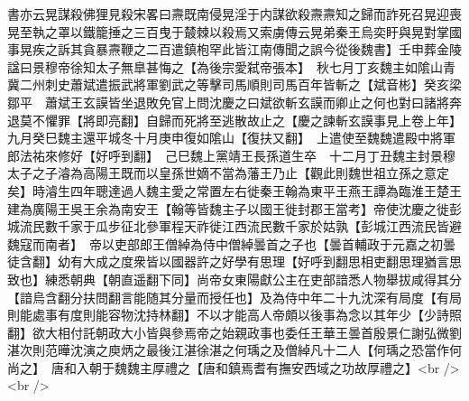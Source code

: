書亦云晃謀殺佛狸見殺宋畧曰燾既南侵晃淫于内謀欲殺燾燾知之歸而詐死召晃迎喪晃至執之罩以鐵籠捶之三百曳于樷棘以殺焉又索虜傳云晃弟秦王烏奕盱與晃對掌國事晃疾之訴其貪暴燾鞭之二百遣鎮枹罕此皆江南傳聞之誤今從後魏書】壬申葬金陵諡曰景穆帝徐知太子無臯甚悔之【為後宗愛弑帝張本】　秋七月丁亥魏主如隂山青冀二州刺史蕭斌遣振武將軍劉武之等擊司馬順則司馬百年皆斬之【斌音彬】癸亥梁鄒平　蕭斌王玄謨皆坐退敗免官上問沈慶之曰斌欲斬玄謨而卿止之何也對曰諸將奔退莫不懼罪【將即亮翻】自歸而死將至逃散故止之【慶之諫斬玄謨事見上卷上年】　九月癸巳魏主還平城冬十月庚申復如隂山【復扶又翻】　上遣使至魏魏遣殿中將軍郎法祐來修好【好呼到翻】　己巳魏上黨靖王長孫道生卒　十二月丁丑魏主封景穆太子之子濬為高陽王既而以皇孫世嫡不當為藩王乃止【觀此則魏世祖立孫之意定矣】時濬生四年聰達過人魏主愛之常置左右徙秦王翰為東平王燕王譚為臨淮王楚王建為廣陽王吳王余為南安王【翰等皆魏主子以國王徙封郡王當考】帝使沈慶之徙彭城流民數千家于瓜步征北參軍程天祚徙江西流民數千家於姑孰【彭城江西流民皆避魏寇而南者】　帝以吏部郎王僧綽為侍中僧綽曇首之子也【曇首輔政于元嘉之初曇徒含翻】幼有大成之度衆皆以國器許之好學有思理【好呼到翻思相吏翻思理猶言思致也】練悉朝典【朝直遥翻下同】尚帝女東陽獻公主在吏部諳悉人物舉拔咸得其分【諳烏含翻分扶問翻言能随其分量而授任也】及為侍中年二十九沈深有局度【有局則能處事有度則能容物沈持林翻】不以才能高人帝頗以後事為念以其年少【少詩照翻】欲大相付託朝政大小皆與參焉帝之始親政事也委任王華王曇首殷景仁謝弘微劉湛次則范曄沈演之庾炳之最後江湛徐湛之何瑀之及僧綽凡十二人【何瑀之恐當作何尚之】　唐和入朝于魏魏主厚禮之【唐和鎮焉耆有撫安西域之功故厚禮之】<br />
<br />

